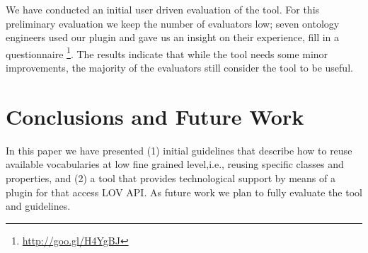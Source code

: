 We have conducted an initial user driven evaluation of the tool. For this preliminary evaluation we keep the number of evaluators low; seven ontology engineers used our plugin and gave us an insight on their experience, fill in a questionnaire \footnote{\url{http://goo.gl/H4YgBJ}}. The results indicate that while the tool needs some minor improvements, the majority of the evaluators still consider the tool to be useful.

\vspace{-3mm}
\section{Conclusions and Future Work}\label{sec:conclusions}
In this paper we have presented (1) initial guidelines that describe how to reuse available vocabularies at low fine grained level,i.e., reusing specific classes and properties, and (2) a tool that provides technological support by means of a plugin for \protege that access LOV API. As future work we plan to fully evaluate the tool and guidelines.


